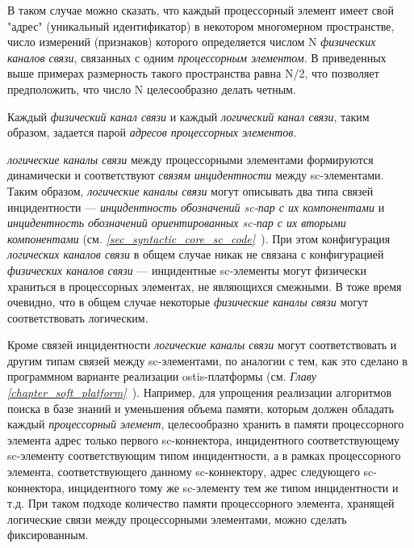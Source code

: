 \begin{textitemize}
\begin{textitemize}
		\item В таком случае можно сказать, что каждый процессорный элемент имеет свой "адрес"{} (уникальный идентификатор) в некотором многомерном пространстве, число измерений (признаков) которого определяется числом N \textit{физических каналов связи}, связанных с одним \textit{процессорным элементом}. В приведенных выше примерах размерность такого пространства равна N/2, что позволяет предположить, что число N целесообразно делать четным.
		\item Каждый \textit{физический канал связи} и каждый \textit{логический канал связи}, таким образом, задается парой \textit{адресов процессорных элементов}.
		\item \textit{логические каналы связи} между процессорными элементами формируются динамически и соответствуют \textit{связям инцидентности} между sc-элементами. Таким образом, \textit{логические каналы связи} могут описывать два типа связей инцидентности --- \textit{инцидентность обозначений sc-пар с их компонентами} и \textit{инцидентность обозначений ориентированных sc-пар с их вторыми компонентами} (см. \textit{\ref{sec_syntactic_core_sc_code}~}). При этом конфигурация \textit{логических каналов связи} в общем случае никак не связана с конфигурацией \textit{физических каналов связи} --- инцидентные sc-элементы могут физически храниться в процессорных элементах, не являющихся смежными. В тоже время очевидно, что в общем случае некоторые \textit{физические каналы связи} могут соответствовать логическим.
		\item Кроме связей инцидентности \textit{логические каналы связи} могут соответствовать и другим типам связей между sc-элементами, по аналогии с тем, как это сделано в программном варианте реализации ostis-платформы (см. \textit{Главу \ref{chapter_soft_platform}~}). Например, для упрощения реализации алгоритмов поиска в базе знаний и уменьшения объема памяти, которым должен обладать каждый \textit{процессорный элемент}, целесообразно хранить в памяти процессорного элемента адрес только первого sc-коннектора, инцидентного соответствующему sc-элементу соответствующим типом инцидентности, а в рамках процессорного элемента, соответствующего данному sc-коннектору, адрес следующего sc-коннектора, инцидентного тому же sc-элементу тем же типом инцидентности и т.д. При таком подходе количество памяти процессорного элемента, хранящей логические связи между процессорными элементами, можно сделать фиксированным.
	\end{textitemize}

\end{textitemize}
